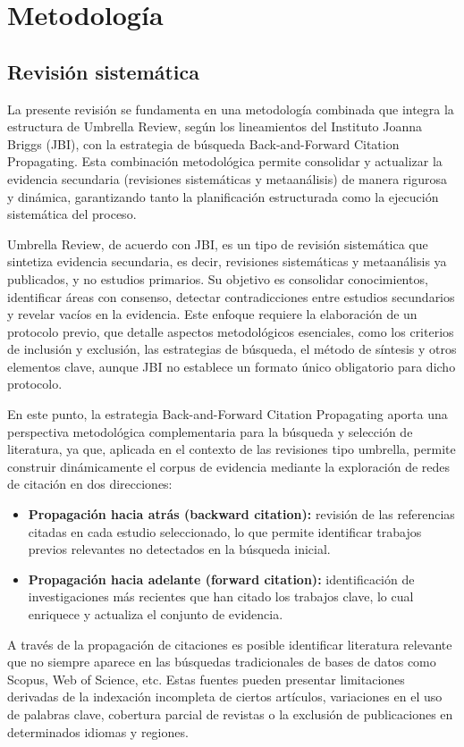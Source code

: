 \chapter{Metodología}
\section{Revisión sistemática}
La presente revisión se fundamenta en una metodología combinada que integra la estructura de
Umbrella Review, según los lineamientos del Instituto Joanna Briggs (JBI), con la estrategia de búsqueda
Back-and-Forward Citation Propagating. Esta combinación metodológica permite consolidar y actualizar
la evidencia secundaria (revisiones sistemáticas y metaanálisis) de manera rigurosa y dinámica, garantizando
tanto la planificación estructurada como la ejecución sistemática del proceso.

Umbrella Review, de acuerdo con JBI, es un tipo de revisión sistemática que sintetiza 
evidencia secundaria, es decir, revisiones sistemáticas y metaanálisis ya publicados, y no 
estudios primarios. Su objetivo es consolidar conocimientos, identificar áreas con consenso,
detectar contradicciones entre estudios secundarios y revelar vacíos en la evidencia. Este 
enfoque requiere la elaboración de un protocolo previo, 
que detalle aspectos metodológicos esenciales, como los criterios de inclusión y exclusión, las estrategias de búsqueda, el método de síntesis y otros elementos clave, 
aunque JBI no establece un formato único obligatorio para dicho protocolo.

En este punto, la estrategia Back-and-Forward Citation Propagating aporta una perspectiva metodológica complementaria para la búsqueda y selección de literatura, ya que, 
aplicada en el contexto de las revisiones tipo umbrella, permite construir
dinámicamente el corpus de evidencia mediante la exploración de redes de citación en dos direcciones:
\begin{itemize}
    \item \textbf{Propagación hacia atrás (backward citation):} revisión de las referencias citadas en cada estudio seleccionado, lo que permite identificar trabajos previos relevantes no detectados en la búsqueda inicial.
    \item \textbf{Propagación hacia adelante (forward citation):} identificación de investigaciones más recientes que han citado los trabajos clave, lo cual enriquece y actualiza el conjunto de evidencia.
\end{itemize}
A través de la propagación de citaciones es posible identificar literatura relevante que no siempre aparece en las búsquedas tradicionales de bases de datos como Scopus, Web of Science, etc.
Estas fuentes pueden presentar limitaciones derivadas de la indexación incompleta de ciertos artículos, variaciones en el uso de palabras clave, cobertura parcial de revistas o la exclusión de publicaciones en determinados idiomas y regiones.


